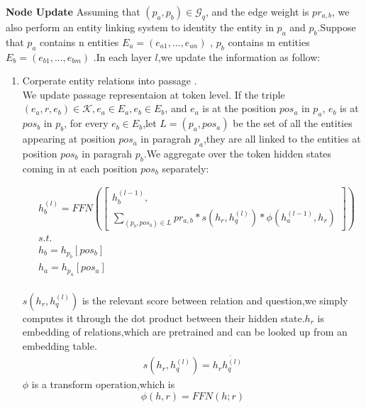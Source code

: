 \documentclass[sigconf]{acmart}
\begin{document}
	\textbf{Node Update}		
	Assuming that $(p_a,p_b) \in \mathcal{G}_q$, and the edge weight is $pr_{a,b}$, we also perform an entity linking system\cite{ferragina2011fast} to identity the  entity in $p_a$ and $p_b$.Suppose that		
	$p_a$ contains n entities $E_{a}=( e_{a1},...,e_{an})$ ,		
	$p_b$ contains m entities $E_{b}=( e_{b1},...,e_{bm})$ .In each layer $l$,we update the information as follow:
	\begin{enumerate}[(1)]
		\item Corperate entity relations into passage .\\	
		We update passage representaion at token level.	
		If the triple $(e_{a},r,e_{b}) \in \mathcal{K},e_{a}\in E_{a},e_{b}\in E_{b} $, and $e_{a}$ is at the position $pos_a$ in $p_a$, $e_{b}$ is at  $pos_b$  in $p_b$,		
		for every $e_{b}\in E_{b}$,let $L=(p_a,pos_a)$ be the set of all the entities appearing at position $pos_a$ in paragrah $p_a$,they are all linked to the entities at position $pos_b$ in paragrah $p_b$.We aggregate over the token hidden states coming in at each position $pos_b$ separately: 
		
		\begin{displaymath}
			\begin{aligned}
				&h^{(l)}_b = FFN
				\left(					 
				\begin{bmatrix}  
					h^{(l-1)}_b,\\ 		
					\sum\limits_{(p_b,pos_b) \in L}
					pr_{a,b}*
					s(h_r,h_q^{(l)})*
					\phi(h^{(l-1)}_a,h_r)
				\end{bmatrix} 
				\right)		\\	
				&s.t.\\
				&	h_b = h_{p_b}[pos_b]\\
				&   h_a = h_{p_a}[pos_a]\\					
			\end{aligned}
		\end{displaymath}
		
		$s(h_r,h_q^{(l)})$ is the relevant score between relation and question,we simply computes it through the dot product between their hidden state.$h_r$ is embedding of  relations,which are pretrained and can be looked up from an embedding table.
		\begin{displaymath}
			\begin{aligned}
				s(h_r,h_q^{(l)}) = h_r\dot{h_q^{(l)}}
			\end{aligned}
		\end{displaymath}
		$\phi$ is a transform operation,which is 
		\begin{displaymath}
			\phi(h,r) = FFN(h;r)
		\end{displaymath}
		

\end{enumerate}
\end{document}
